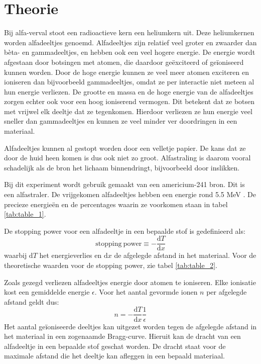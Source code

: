 \documentclass[11pt,a4paper]{article}
\begin{document}
\section{Theorie}
Bij alfa-verval stoot een radioactieve kern een heliumkern uit. Deze heliumkernen worden alfadeeltjes genoemd. Alfadeeltjes zijn relatief veel groter en zwaarder dan bèta- en gammadeeltjes, en hebben ook een veel hogere energie. De energie wordt afgestaan door botsingen met atomen, die daardoor geëxciteerd of geïoniseerd kunnen worden. Door de hoge energie kunnen ze veel meer atomen exciteren en ioniseren dan bijvoorbeeld gammadeeltjes, omdat ze per interactie niet meteen al hun energie verliezen. De grootte en massa en de hoge energie van de alfadeeltjes zorgen echter ook voor een hoog ioniserend vermogen. Dit betekent dat ze botsen met vrijwel elk deeltje dat ze tegenkomen. Hierdoor verliezen ze hun energie veel sneller dan gammadeeltjes en kunnen ze veel minder ver doordringen in een materiaal.\par
Alfadeeltjes kunnen al gestopt worden door een velletje papier. De kans dat ze door de huid heen komen is dus ook niet zo groot. Alfastraling is daarom vooral schadelijk als de bron het lichaam binnendringt, bijvoorbeeld door inslikken.\par
Bij dit experiment wordt gebruik gemaakt van een americium-241 bron. Dit is een alfastraler. De vrijgekomen alfadeeltjes hebben een energie rond 5.5 MeV \cite{Americium241}. De precieze energieën en de percentages waarin ze voorkomen staan in tabel \ref{tab:table_1}. \par
De stopping power voor een alfadeeltje in een bepaalde stof is gedefinieerd als:
\begin{equation}
\mathrm{stopping \ power} \equiv -\frac{\mathrm{d}T}{\mathrm{d}x}
\label{eq:stopping_power}
\end{equation}
waarbij $\mathrm{d}T$ het energieverlies en $\mathrm{d}x$ de afgelegde afstand in het materiaal. Voor de theoretische waarden voor de stopping power, zie tabel \ref{tab:table_2}.\par
Zoals gezegd verliezen alfadeeltjes energie door atomen te ioniseren. Elke ionisatie kost een gemiddelde energie $\epsilon$. Voor het aantal gevormde ionen $n$ per afgelegde afstand geldt dus:
\begin{equation}
n =  -\frac{\mathrm{d}T}{\mathrm{d}x}\frac{1}{\epsilon}
\label{eq:ioniaties}
\end{equation}
Het aantal geïoniseerde deeltjes kan uitgezet worden tegen de afgelegde afstand in het materiaal in een zogenaamde Bragg-curve. Hieruit kan de dracht van een alfadeeltje in een bepaalde stof geschat worden. De dracht staat voor de maximale afstand die het deeltje kan afleggen in een bepaald materiaal.\par
\end{document}
